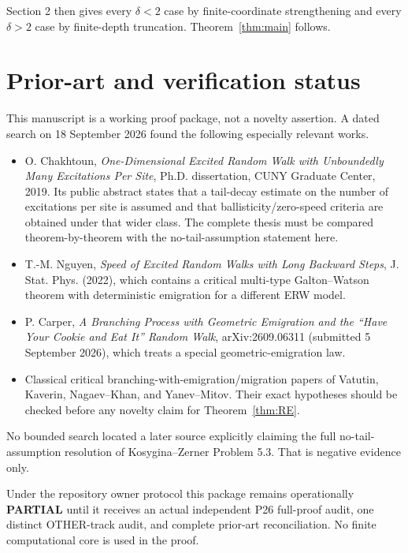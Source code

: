 \documentclass[11pt]{article}
\begin{document}
Section 2 then gives every $\delta<2$ case by finite-coordinate strengthening and every $\delta>2$ case by finite-depth truncation.  Theorem~\ref{thm:main} follows.

\section{Prior-art and verification status}

This manuscript is a working proof package, not a novelty assertion.  A dated search on 18 September 2026 found the following especially relevant works.

\begin{itemize}
\item O. Chakhtoun, \emph{One-Dimensional Excited Random Walk with Unboundedly Many Excitations Per Site}, Ph.D. dissertation, CUNY Graduate Center, 2019.  Its public abstract states that a tail-decay estimate on the number of excitations per site is assumed and that ballisticity/zero-speed criteria are obtained under that wider class.  The complete thesis must be compared theorem-by-theorem with the no-tail-assumption statement here.
\item T.-M. Nguyen, \emph{Speed of Excited Random Walks with Long Backward Steps}, J. Stat. Phys. (2022), which contains a critical multi-type Galton--Watson theorem with deterministic emigration for a different ERW model.
\item P. Carper, \emph{A Branching Process with Geometric Emigration and the ``Have Your Cookie and Eat It'' Random Walk}, arXiv:2609.06311 (submitted 5 September 2026), which treats a special geometric-emigration law.
\item Classical critical branching-with-emigration/migration papers of Vatutin, Kaverin, Nagaev--Khan, and Yanev--Mitov.  Their exact hypotheses should be checked before any novelty claim for Theorem~\ref{thm:RE}.
\end{itemize}

No bounded search located a later source explicitly claiming the full no-tail-assumption resolution of Kosygina--Zerner Problem 5.3.  That is negative evidence only.

Under the repository owner protocol this package remains operationally \textbf{PARTIAL} until it receives an actual independent P26 full-proof audit, one distinct OTHER-track audit, and complete prior-art reconciliation.  No finite computational core is used in the proof.
\end{document}

